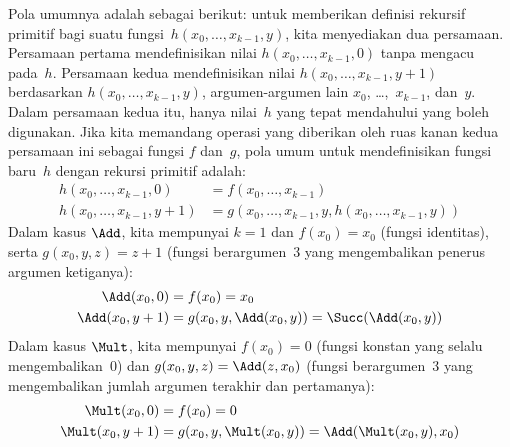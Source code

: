 \documentclass[../../../include/open-logic-section]{subfiles}
\begin{document}
Pola umumnya adalah sebagai berikut: untuk memberikan definisi rekursif
primitif bagi suatu fungsi~$h(x_0, \dots, x_{k-1}, y)$, kita menyediakan dua
persamaan. Persamaan pertama mendefinisikan nilai
$h(x_0, \dots, x_{k-1}, 0)$ tanpa mengacu pada~$h$. Persamaan kedua
mendefinisikan nilai $h(x_0, \dots, x_{k-1}, y+1)$ berdasarkan
$h(x_0, \dots, x_{k-1}, y)$, argumen-argumen lain $x_0$, \dots,~$x_{k-1}$,
dan~$y$. Dalam persamaan kedua itu, hanya nilai~$h$ yang tepat mendahului yang
boleh digunakan. Jika kita memandang operasi yang diberikan oleh ruas kanan
kedua persamaan ini sebagai fungsi $f$ dan~$g$, pola umum untuk mendefinisikan
fungsi baru~$h$ dengan rekursi primitif adalah:
\begin{align*}
  h(x_0, \dots, x_{k-1}, 0) & = f(x_0, \dots, x_{k-1})\\
  h(x_0, \dots, x_{k-1}, y+1) & =
  g(x_0, \dots, x_{k-1}, y, h(x_0, \dots, x_{k-1}, y))
\end{align*}
Dalam kasus $\Add$, kita mempunyai $k=1$ dan $f(x_0) = x_0$ (fungsi
identitas), serta $g(x_0, y, z) = z + 1$ (fungsi berargumen~$3$ yang
mengembalikan penerus argumen ketiganya):
\begin{align*}
  \Add(x_0, 0) & = f(x_0) = x_0\\
  \Add(x_0, y+1) & = g(x_0, y, \Add(x_0, y)) =
  \Succ(\Add(x_0, y))
\end{align*}
Dalam kasus $\Mult$, kita mempunyai $f(x_0) = 0$ (fungsi konstan yang selalu
mengembalikan~$0$) dan $g(x_0, y, z) = \Add(z,x_0)$ (fungsi berargumen~$3$
yang mengembalikan jumlah argumen terakhir dan pertamanya):
\begin{align*}
  \Mult(x_0,0) & =  f(x_0) = 0 \\
  \Mult(x_0,y+1) & =  g(x_0, y, \Mult(x_0,y)) =
  \Add(\Mult(x_0,y), x_0)
\end{align*}
\end{document}
